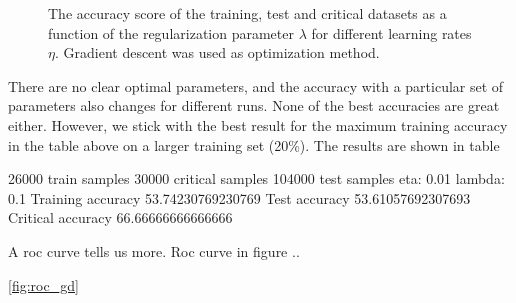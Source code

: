 \begin{figure}[H]
\qquad
{}
\caption{The accuracy score of the training, test and critical datasets as a function of the regularization parameter $\lambda$ for different learning rates $\eta$. Gradient descent was used as optimization method.}
\label{fig:gd_acc_lambda}
\end{figure}



There are no clear optimal parameters, and the accuracy with a particular set of parameters also changes for different runs. None of the best accuracies are great either. However, we stick with the best result for the maximum training accuracy in the table above on a larger training set (20\%). The results are shown in table

26000 train samples
30000 critical samples
104000 test samples
eta: 0.01
lambda: 0.1
Training accuracy 53.74230769230769
Test accuracy 53.61057692307693
Critical accuracy 66.66666666666666

A roc curve tells us more. Roc curve in figure ..

\autoref{fig:roc_gd}

